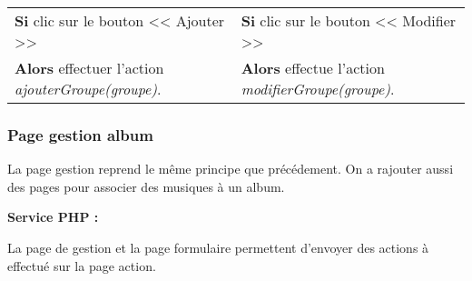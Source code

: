             \begin{center}
                \begin{tabular}{l | l}
                    \textbf{Si} clic sur le bouton << Ajouter >> & \textbf{Si} clic sur le bouton << Modifier >> \\
                    \textbf{Alors} effectuer l'action \emph{ajouterGroupe(groupe)}. & \textbf{Alors} effectue l'action \emph{modifierGroupe(groupe)}.
                \end{tabular}
            \end{center}
            
			
            
    \newpage

		\subsubsection{Page gestion album}

			\begin{paragraphe}
                La page gestion reprend le même principe que précédement. On a rajouter aussi des pages pour associer des musiques à un album.
			\end{paragraphe}

			\begin{paragraphe}
				\textbf{Service PHP :}
			\end{paragraphe}
            
            \begin{paragraphe}
                La page de gestion et la page formulaire permettent d'envoyer des actions à effectué sur la page action. \\
			\end{paragraphe}

